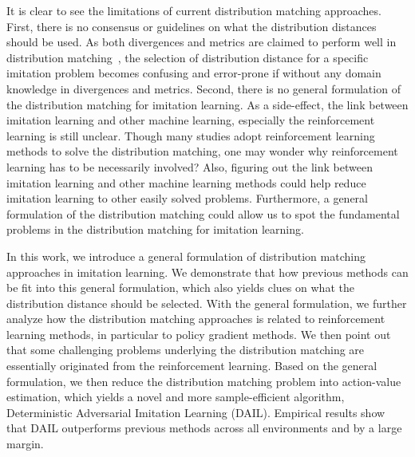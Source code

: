 It is clear to see the limitations of current distribution matching approaches.
First, there is no consensus or guidelines on what the distribution distances should be used. 
As both divergences and metrics are claimed to perform well in distribution matching~\citep{ke2019imitation,ghasemipour2020divergence,xiao2019wasserstein}, the selection of distribution distance for a specific imitation problem becomes confusing and error-prone if without any domain knowledge in divergences and metrics.
Second, there is no general formulation of the distribution matching for imitation learning.
As a side-effect, the link between imitation learning and other machine learning, especially the reinforcement learning is still unclear.
Though many studies adopt reinforcement learning methods to solve the distribution matching, 
one may wonder why reinforcement learning has to be necessarily involved?
Also, figuring out the link between imitation learning and other machine learning methods could help reduce imitation learning to other easily solved problems. 
Furthermore, a general formulation of the distribution matching could allow us to spot the fundamental problems in the distribution matching for imitation learning. 


In this work, we introduce a general formulation of distribution matching approaches in imitation learning. 
We demonstrate that how previous methods can be fit into this general formulation, 
which also yields clues on what the distribution distance should be selected. 
With the general formulation, we further analyze how the distribution matching approaches is related to reinforcement learning methods, in particular to policy gradient methods. 
We then point out that some challenging problems underlying the distribution matching are essentially originated from the reinforcement learning. 
Based on the general formulation, we then reduce the distribution matching problem into action-value estimation, which yields a novel and more sample-efficient algorithm, Deterministic Adversarial Imitation Learning (DAIL). 
Empirical results show that DAIL outperforms previous methods across all environments and by a large margin. 
